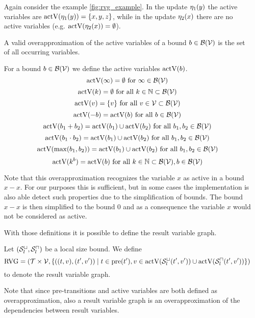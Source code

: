 Again consider the example \ref{fig:rvg_example}.
In the update $\eta_1(y)$ the active variables are $\text{actV}(\eta_1(y)) = \lbrace x,y,z \rbrace$, while in the update $\eta_2(x)$ there are no active variables (e.g. $\text{actV}(\eta_2(x)) = \emptyset$).

A valid overapproximation of the active variables of a bound $b \in \mathcal{B}(\mathcal{V})$ is the set of all occurring variables.
\begin{definition}
  For a bound $b \in \mathcal{B}(\mathcal{V})$ we define the active variables $\text{actV}(b)$.
  \[ \text{actV}(\infty) = \emptyset \text{ for } \infty \in \mathcal{B}(\mathcal{V}) \]
  \[ \text{actV}(k) = \emptyset \text{ for all } k \in \mathbb{N} \subset \mathcal{B}(\mathcal{V}) \] 
  \[ \text{actV}(v) = \lbrace v \rbrace \text{ for all } v \in \mathcal{V} \subset \mathcal{B}(\mathcal{V}) \] 
  \[ \text{actV}(-b) = \text{actV}(b) \text{ for all } b \in \mathcal{B}(\mathcal{V}) \] 
  \[ \text{actV}(b_1 + b_2) = \text{actV}(b_1) \cup \text{actV}(b_2) \text{ for all } b_1, b_2 \in \mathcal{B}(\mathcal{V}) \] 
  \[ \text{actV}(b_1 \cdot b_2) = \text{actV}(b_1) \cup \text{actV}(b_2) \text{ for all } b_1, b_2 \in \mathcal{B}(\mathcal{V}) \] 
  \[ \text{actV}(\max(b_1, b_2)) = \text{actV}(b_1) \cup \text{actV}(b_2) \text{ for all } b_1, b_2 \in \mathcal{B}(\mathcal{V}) \]
  \[ \text{actV}(k^b) = \text{actV}(b) \text{ for all } k \in \mathbb{N} \subset \mathcal{B}(\mathcal{V}), b \in \mathcal{B}(\mathcal{V}) \]  
\end{definition}

Note that this overapproximation recognizes the variable $x$ as active in a bound $x - x$.
For our purposes this is sufficient, but in some cases the implementation is also able detect such properties due to the simplification of bounds.
The bound $x - x$ is then simplified to the bound $0$ and as a consequence the variable $x$ would not be considered as active.

With those definitions it is possible to define the result variable graph.


\begin{definition}
	Let ${({\mathcal{S}^\sqcup_l}, {\mathcal{S}^\sqcap_l})}$ be a local size bound.
	We define 
	\[ \text{RVG} = (\mathcal{T} \times \mathcal{V}, \lbrace ((t, v), (t', v')) \mid t \in \text{pre}(t'), v \in \text{actV}({\mathcal{S}^\sqcup_l}(t',v')) \cup \text{actV}({\mathcal{S}^\sqcap_l}(t',v')) \rbrace) \]
	to denote the result variable graph.
\end{definition}

Note that since pre-transitions and active variables are both defined as overapproximation, also a result variable graph is an overapproximation of the dependencies between result variables.

